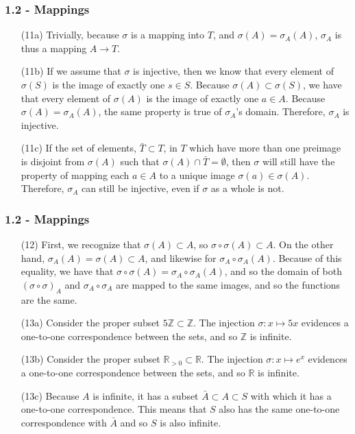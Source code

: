 \documentclass{beamer}
\begin{document}
\begin{frame}
\frametitle{1.2 - Mappings}
\small
\begin{enumerate}
	\item[(11a)] Trivially, because $\sigma$ is a mapping into $T$, and $\sigma(A) = \sigma_A(A)$, $\sigma_A$ is thus a mapping $A\to T$.
	\item[(11b)] If we assume that $\sigma$ is injective, then we know that every element of $\sigma(S)$ is the image of exactly one $s\in S$. Because $\sigma(A)\subset\sigma(S)$, we have that every element of $\sigma(A)$ is the image of exactly one $a\in A$. Because $\sigma(A) = \sigma_A(A)$, the same property is true of $\sigma_A$'s domain. Therefore, $\sigma_A$ is injective. 
	\item[(11c)] If the set of elements, $\bar{T}\subset T$, in $T$ which have more than one preimage is disjoint from $\sigma(A)$ such that $\sigma(A)\cap\bar{T}=\emptyset$, then $\sigma$ will still have the property of mapping each $a\in A$ to a unique image $\sigma(a)\in\sigma(A)$. Therefore, $\sigma_A$ can still be injective, even if $\sigma$ as a whole is not.
\end{enumerate}
\end{frame}
\begin{frame}
\frametitle{1.2 - Mappings}
\small
\begin{enumerate}
	\item[(12)] First, we recognize that $\sigma(A)\subset A$, so $\sigma\circ\sigma(A)\subset A$. On the other hand, $\sigma_A(A) = \sigma(A) \subset A$, and likewise for $\sigma_A\circ\sigma_A(A)$. Because of this equality, we have that $\sigma\circ\sigma(A) = \sigma_A\circ\sigma_A(A)$, and so the domain of both $(\sigma\circ\sigma)_A$ and $\sigma_A\circ\sigma_A$ are mapped to the same images, and so the functions are the same.
	\item[(13a)] Consider the proper subset $5\mathbb Z \subset \mathbb Z$. The injection $\sigma: x\mapsto 5x$ evidences a one-to-one correspondence between the sets, and so $\mathbb Z$ is infinite.
	\item[(13b)] Consider the proper subset $\mathbb R_{>0} \subset \mathbb R$. The injection $\sigma: x\mapsto e^x$ evidences a one-to-one correspondence between the sets, and so $\mathbb R$ is infinite.
	\item[(13c)] Because $A$ is infinite, it has a subset $\bar{A}\subset A\subset S$ with which it has a one-to-one correspondence. This means that $S$ also has the same one-to-one correspondence with $\bar{A}$ and so $S$ is also infinite.
\end{enumerate}
\end{frame}
\end{document}

